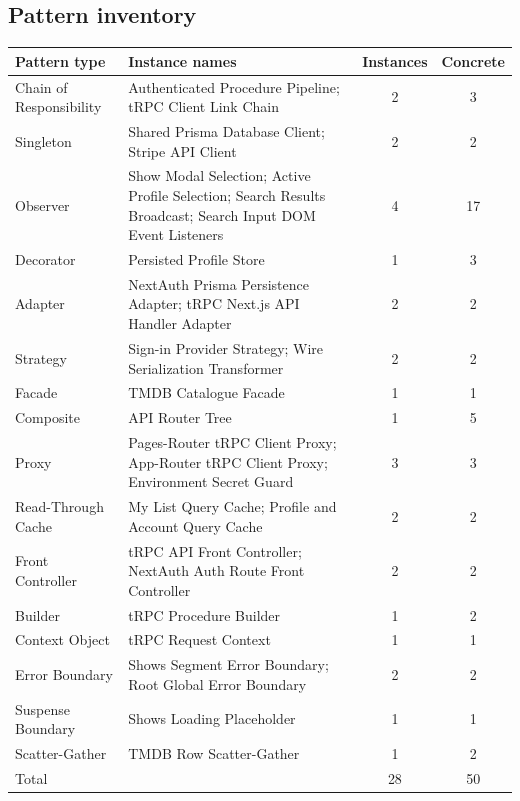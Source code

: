 \documentclass[11pt,a4paper]{article}
\begin{document}
\subsection{Pattern inventory}
\begin{longtable}{@{}p{3.3cm}p{8.3cm}cc@{}}\toprule
Pattern type & Instance names & Instances & Concrete\\\midrule\endhead
Chain of Responsibility & Authenticated Procedure Pipeline; tRPC Client Link Chain & 2 & 3\\
Singleton & Shared Prisma Database Client; Stripe API Client & 2 & 2\\
Observer & Show Modal Selection; Active Profile Selection; Search Results Broadcast; Search Input DOM Event Listeners & 4 & 17\\
Decorator & Persisted Profile Store & 1 & 3\\
Adapter & NextAuth Prisma Persistence Adapter; tRPC Next.js API Handler Adapter & 2 & 2\\
Strategy & Sign-in Provider Strategy; Wire Serialization Transformer & 2 & 2\\
Facade & TMDB Catalogue Facade & 1 & 1\\
Composite & API Router Tree & 1 & 5\\
Proxy & Pages-Router tRPC Client Proxy; App-Router tRPC Client Proxy; Environment Secret Guard & 3 & 3\\
Read-Through Cache & My List Query Cache; Profile and Account Query Cache & 2 & 2\\
Front Controller & tRPC API Front Controller; NextAuth Auth Route Front Controller & 2 & 2\\
Builder & tRPC Procedure Builder & 1 & 2\\
Context Object & tRPC Request Context & 1 & 1\\
Error Boundary & Shows Segment Error Boundary; Root Global Error Boundary & 2 & 2\\
Suspense Boundary & Shows Loading Placeholder & 1 & 1\\
Scatter-Gather & TMDB Row Scatter-Gather & 1 & 2\\
\midrule Total & & 28 & 50\\\bottomrule\end{longtable}
\end{document}
